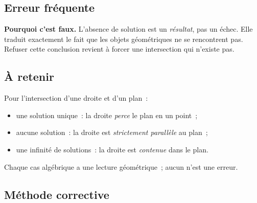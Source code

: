 

\subsection*{Erreur fréquente}


\textbf{Pourquoi c'est faux.} L'absence de solution est un \emph{résultat},
pas un échec. Elle traduit exactement le fait que les objets géométriques ne
se rencontrent pas. Refuser cette conclusion revient à forcer une intersection
qui n'existe pas.

\subsection*{À retenir}

Pour l'intersection d'une droite et d'un plan~:
\begin{itemize}
  \item une solution unique~: la droite \emph{perce} le plan en un point~;
  \item aucune solution~: la droite est \emph{strictement parallèle} au plan~;
  \item une infinité de solutions~: la droite est \emph{contenue} dans le plan.
\end{itemize}
Chaque cas algébrique a une lecture géométrique~; aucun n'est une erreur.

\subsection*{Méthode corrective}

